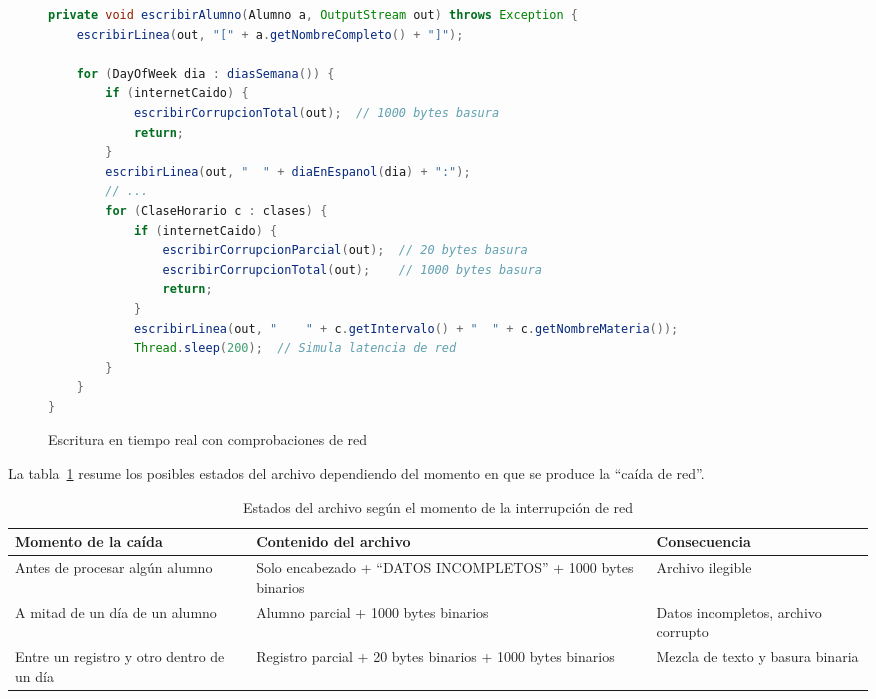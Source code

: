 \begin{figure}[H]
    \centering
    \begin{minipage}{0.9\textwidth}
    \caption{Escritura en tiempo real con comprobaciones de red}
    \label{code:vuln-escritura-red}
    \vspace{-0.2cm}
    \begin{lstlisting}[language=Java, basicstyle=\scriptsize\ttfamily]
private void escribirAlumno(Alumno a, OutputStream out) throws Exception {
    escribirLinea(out, "[" + a.getNombreCompleto() + "]");

    for (DayOfWeek dia : diasSemana()) {
        if (internetCaido) {
            escribirCorrupcionTotal(out);  // 1000 bytes basura
            return;
        }
        escribirLinea(out, "  " + diaEnEspanol(dia) + ":");
        // ...
        for (ClaseHorario c : clases) {
            if (internetCaido) {
                escribirCorrupcionParcial(out);  // 20 bytes basura
                escribirCorrupcionTotal(out);    // 1000 bytes basura
                return;
            }
            escribirLinea(out, "    " + c.getIntervalo() + "  " + c.getNombreMateria());
            Thread.sleep(200);  // Simula latencia de red
        }
    }
}
    \end{lstlisting}
    \end{minipage}
\end{figure}

La tabla~\ref{tab:vuln-red-escenarios} resume los posibles estados del archivo dependiendo del
momento en que se produce la ``caída de red''.

\begin{table}[H]
\centering
\caption{Estados del archivo según el momento de la interrupción de red}
\label{tab:vuln-red-escenarios}
\begin{tabular}{|p{3.8cm}|p{4.5cm}|p{4.8cm}|}
\hline
\textbf{Momento de la caída} & \textbf{Contenido del archivo} & \textbf{Consecuencia} \\
\hline
Antes de procesar algún alumno &
Solo encabezado + ``DATOS INCOMPLETOS'' + 1000 bytes binarios &
Archivo ilegible \\
\hline
A mitad de un día de un alumno &
Alumno parcial + 1000 bytes binarios &
Datos incompletos, archivo corrupto \\
\hline
Entre un registro y otro dentro de un día &
Registro parcial + 20 bytes binarios + 1000 bytes binarios &
Mezcla de texto y basura binaria \\
\hline
\end{tabular}
\end{table}

